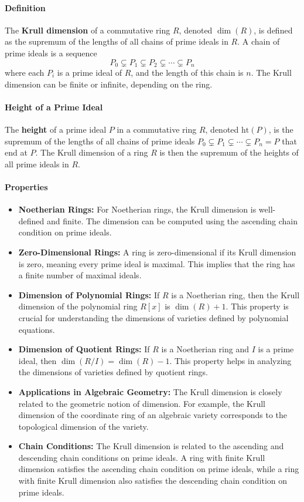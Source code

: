 \documentclass[12pt]{article}
\theoremstyle{definition}
\numberwithin{equation}{subsection}
\begin{document}
\paragraph{Definition}
The \textbf{Krull dimension} of a commutative ring $R$, denoted $\dim(R)$, is defined as the supremum of the lengths of all chains of prime ideals in $R$. A chain of prime ideals is a sequence
\[
P_0 \subsetneq P_1 \subsetneq P_2 \subsetneq \cdots \subsetneq P_n
\]
where each $P_i$ is a prime ideal of $R$, and the length of this chain is $n$. The Krull dimension can be finite or infinite, depending on the ring.

\paragraph{Height of a Prime Ideal}
The \textbf{height} of a prime ideal $P$ in a commutative ring $R$, denoted $\mathrm{ht}(P)$, is the supremum of the lengths of all chains of prime ideals $P_0 \subsetneq P_1 \subsetneq \cdots \subsetneq P_n = P$ that end at $P$. The Krull dimension of a ring $R$ is then the supremum of the heights of all prime ideals in $R$.
\paragraph{Properties}
\begin{itemize}
\item \textbf{Noetherian Rings:} For Noetherian rings, the Krull dimension is well-defined and finite. The dimension can be computed using the ascending chain condition on prime ideals.
\item \textbf{Zero-Dimensional Rings:} A ring is zero-dimensional if its Krull dimension is zero, meaning every prime ideal is maximal. This implies that the ring has a finite number of maximal ideals.
\item \textbf{Dimension of Polynomial Rings:} If $R$ is a Noetherian ring, then the Krull dimension of the polynomial ring $R[x]$ is $\dim(R) + 1$. This property is crucial for understanding the dimensions of varieties defined by polynomial equations.
\item \textbf{Dimension of Quotient Rings:} If $R$ is a Noetherian ring and $I$ is a prime ideal, then $\dim(R/I) = \dim(R) - 1$. This property helps in analyzing the dimensions of varieties defined by quotient rings.
\item \textbf{Applications in Algebraic Geometry:} The Krull dimension is closely related to the geometric notion of dimension. For example, the Krull dimension of the coordinate ring of an algebraic variety corresponds to the topological dimension of the variety.
\item \textbf{Chain Conditions:} The Krull dimension is related to the ascending and descending chain conditions on prime ideals. A ring with finite Krull dimension satisfies the ascending chain condition on prime ideals, while a ring with finite Krull dimension also satisfies the descending chain condition on prime ideals.
\end{itemize}
\end{document}
